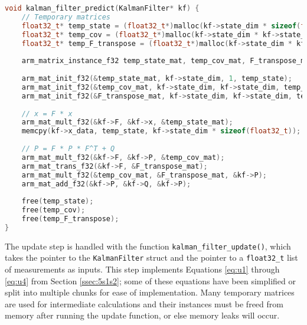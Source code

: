 \documentclass[12pt,a4paper]{report}
\begin{document}
\begin{lstlisting}[language=C++]
void kalman_filter_predict(KalmanFilter* kf) {
	// Temporary matrices
	float32_t* temp_state = (float32_t*)malloc(kf->state_dim * sizeof(float32_t));
	float32_t* temp_cov = (float32_t*)malloc(kf->state_dim * kf->state_dim * sizeof(float32_t));
	float32_t* temp_F_transpose = (float32_t*)malloc(kf->state_dim * kf->state_dim * sizeof(float32_t));
	
	arm_matrix_instance_f32 temp_state_mat, temp_cov_mat, F_transpose_mat;
	
	arm_mat_init_f32(&temp_state_mat, kf->state_dim, 1, temp_state);
	arm_mat_init_f32(&temp_cov_mat, kf->state_dim, kf->state_dim, temp_cov);
	arm_mat_init_f32(&F_transpose_mat, kf->state_dim, kf->state_dim, temp_F_transpose);
	
	// x = F * x
	arm_mat_mult_f32(&kf->F, &kf->x, &temp_state_mat);
	memcpy(kf->x_data, temp_state, kf->state_dim * sizeof(float32_t));
	
	// P = F * P * F^T + Q
	arm_mat_mult_f32(&kf->F, &kf->P, &temp_cov_mat);
	arm_mat_trans_f32(&kf->F, &F_transpose_mat);
	arm_mat_mult_f32(&temp_cov_mat, &F_transpose_mat, &kf->P);
	arm_mat_add_f32(&kf->P, &kf->Q, &kf->P);
	
	free(temp_state);
	free(temp_cov);
	free(temp_F_transpose);
}
\end{lstlisting}

The update step is handled with the function \verb|kalman_filter_update()|, which takes the pointer to the \verb|KalmanFilter| struct and the pointer to a \verb|float32_t| list of measurements as inputs. This step implements Equations \ref{eq:u1} through \ref{eq:u4} from Section \ref{ssec:5s1s2}; some of these equations have been simplified or split into multiple chunks for ease of implementation. Many temporary matrices are used for intermediate calculations and their instances must be freed from memory after running the update function, or else memory leaks will occur.
\end{document}

